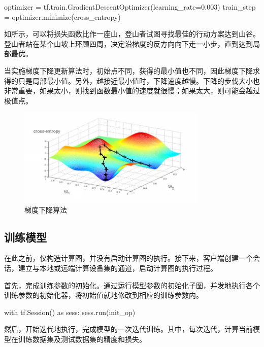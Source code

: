 \begin{content}
\begin{content}
\begin{leftbar}
\begin{python}
optimizer = tf.train.GradientDescentOptimizer(learning_rate=0.003)
train_step = optimizer.minimize(cross_entropy)
\end{python}
\end{leftbar}

如所示，可以将损失函数比作一座山，登山者试图寻找最佳的行动方案达到山谷。登山者站在某个山坡上环顾四周，决定沿梯度的反方向向下走一小步，直到达到局部最优。

当实施梯度下降更新算法时，初始点不同，获得的最小值也不同，因此梯度下降求得的只是局部最小值。另外，越接近最小值时，下降速度越慢。下降的步伐大小也非常重要，如果太小，则找到函数最小值的速度就很慢；如果太大，则可能会越过极值点。

\begin{figure}[H]
\centering
\includegraphics[width=0.8\textwidth]{figures/mnist-gd.jpeg}
\caption{梯度下降算法}
 \label{fig:mnist-gd}
\end{figure}

\subsection{训练模型}

在此之前，\tf{}仅构造计算图，并没有启动计算图的执行。接下来，客户端创建一个会话，建立与本地或远端计算设备集的通道，启动计算图的执行过程。

首先，完成训练参数的初始化。通过运行模型参数的初始化子图，并发地执行各个训练参数的初始化器，将初始值就地修改到相应的训练参数内。

\begin{leftbar}
\begin{python}
with tf.Session() as sess:
  sess.run(init_op)
\end{python}
\end{leftbar}

然后，开始迭代地执行，完成模型的一次迭代训练。其中，每次迭代，计算当前模型在训练数据集及测试数据集的精度和损失。


\end{content}
\end{content}
